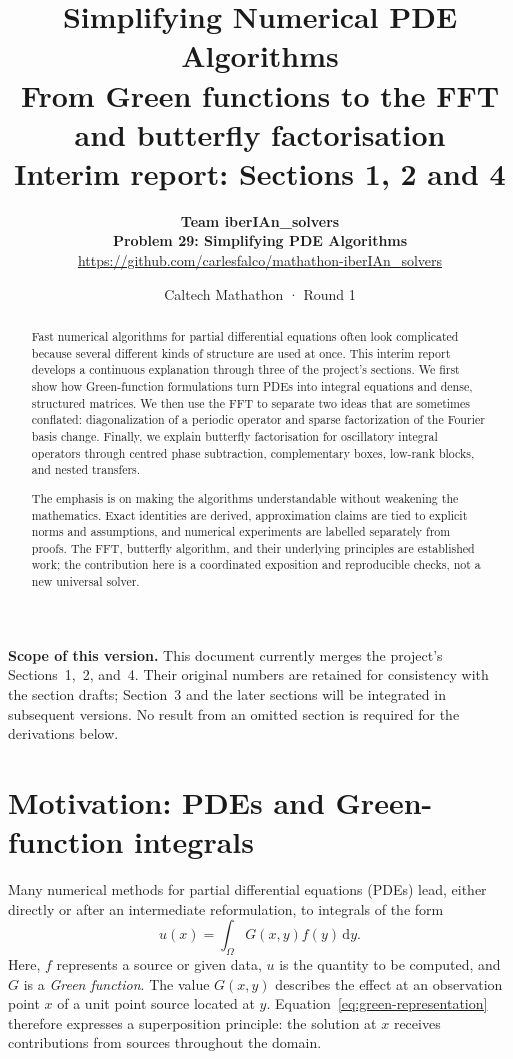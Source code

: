 \documentclass[11pt,a4paper]{article}
\title{\vspace{-8mm}\LARGE\bfseries Simplifying Numerical PDE Algorithms\\[5pt]
\Large From Green functions to the FFT and butterfly factorisation\\[4pt]
\large Interim report: Sections 1, 2 and 4}
\author{\Large\textbf{Team iberIAn\_solvers}\\[4pt]
\textbf{Problem 29: Simplifying PDE Algorithms}\\[4pt]
\url{https://github.com/carlesfalco/mathathon-iberIAn_solvers}}
\date{Caltech Mathathon · Round 1}
\numberwithin{equation}{section}
\begin{document}
\maketitle
\thispagestyle{fancy}

\begin{abstract}
\noindent
Fast numerical algorithms for partial differential equations often look complicated because several different kinds of structure are used at once. This interim report develops a continuous explanation through three of the project's sections. We first show how Green-function formulations turn PDEs into integral equations and dense, structured matrices. We then use the FFT to separate two ideas that are sometimes conflated: diagonalization of a periodic operator and sparse factorization of the Fourier basis change. Finally, we explain butterfly factorisation for oscillatory integral operators through centred phase subtraction, complementary boxes, low-rank blocks, and nested transfers.

The emphasis is on making the algorithms understandable without weakening the mathematics. Exact identities are derived, approximation claims are tied to explicit norms and assumptions, and numerical experiments are labelled separately from proofs. The FFT, butterfly algorithm, and their underlying principles are established work; the contribution here is a coordinated exposition and reproducible checks, not a new universal solver.
\end{abstract}

\noindent\textbf{Scope of this version.} This document currently merges the project's Sections~1,~2, and~4. Their original numbers are retained for consistency with the section drafts; Section~3 and the later sections will be integrated in subsequent versions. No result from an omitted section is required for the derivations below.

\tableofcontents
\clearpage


\section{Motivation: PDEs and Green-function integrals}
\label{sec:motivation}

Many numerical methods for partial differential equations (PDEs) lead, either directly or after an intermediate reformulation, to integrals of the form
\begin{equation}
    u(x) = \int_\Omega G(x,y) f(y)\,\mathrm{d}y.
    \label{eq:green-representation}
\end{equation}
Here, $f$ represents a source or given data, $u$ is the quantity to be computed, and $G$ is a \emph{Green function}. The value $G(x,y)$ describes the effect at an observation point $x$ of a unit point source located at $y$. Equation~\eqref{eq:green-representation} therefore expresses a superposition principle: the solution at $x$ receives contributions from sources throughout the domain.
\end{document}
